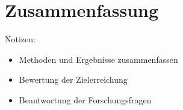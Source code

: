 \chapter{Zusammenfassung}
\thispagestyle{fancy}
\label{chap:Zusammenfassung}

Notizen:
\begin{itemize}
	\item Methoden und Ergebnisse zusammenfassen
	\item Bewertung der Zielerreichung
	\item Beantwortung der Forschungsfragen
\end{itemize}
